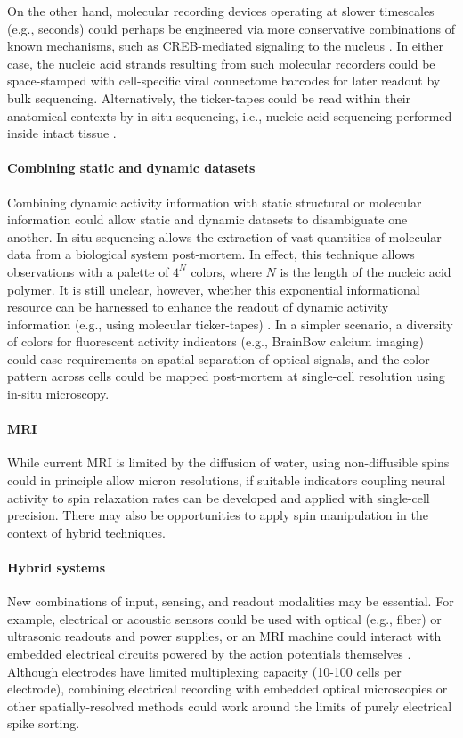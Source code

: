 On the other hand, molecular recording devices operating at slower timescales (e.g., seconds) could perhaps be engineered via more conservative combinations of known mechanisms, such as CREB-mediated signaling to the nucleus \cite{Deisseroth2012}. In either case, the nucleic acid strands resulting from such molecular recorders could be space-stamped with cell-specific viral connectome barcodes for later readout by bulk sequencing. Alternatively, the ticker-tapes could be read within their anatomical contexts by in-situ sequencing, i.e., nucleic acid sequencing performed inside intact tissue \cite{Lee2013InSitu}.

\paragraph{Combining static and dynamic datasets} Combining dynamic activity information with static structural or molecular information could allow static and dynamic datasets to disambiguate one another. In-situ sequencing allows the extraction of vast quantities of molecular data from a biological system post-mortem. In effect, this technique allows observations with a palette of $4^N$ colors, where $N$ is the length of the nucleic acid polymer. It is still unclear, however, whether this exponential informational resource can be harnessed to enhance the readout of dynamic activity information (e.g., using molecular ticker-tapes) \cite{MarblestoneRosetta2013Chapter}. In a simpler scenario, a diversity of colors for fluorescent activity indicators (e.g., BrainBow calcium imaging) could ease requirements on spatial separation of optical signals, and the color pattern across cells could be mapped post-mortem at single-cell resolution using in-situ microscopy.

\paragraph{MRI} While current MRI is limited by the diffusion of water, using non-diffusible spins could in principle allow micron resolutions, if suitable  indicators coupling neural activity to spin relaxation rates can be developed and applied with single-cell precision. There may also be opportunities to apply spin manipulation in the context of hybrid techniques.

\paragraph{Hybrid systems} New combinations of input, sensing, and readout modalities may be essential. For example, electrical or acoustic sensors could be used with optical \cite{sadek2010wiring} (e.g., fiber) or ultrasonic readouts and power supplies, or an MRI machine could interact with embedded electrical circuits powered by the action potentials themselves \cite{JasanoffInductorsGrant}. Although electrodes have limited multiplexing capacity (10-100 cells per electrode), combining electrical recording with embedded optical microscopies or other spatially-resolved methods could work around the limits of purely electrical spike sorting.

